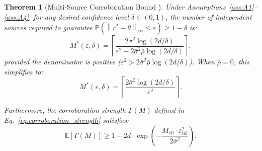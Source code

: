 \documentclass[11pt,a4paper]{article}
\newtheorem{theorem}{Theorem}[section]
\theoremstyle{definition}
\newcommand{\E}{\mathbb{E}}
\newcommand{\Pbb}{\mathbb{P}}
\newcommand{\norm}[1]{\left\lVert#1\right\rVert}
\begin{document}
\begin{theorem}[Multi-Source Corroboration Bound ]
\label{thm:corroboration}
Under Assumptions~\ref{ass:A1}--\ref{ass:A4}, for any desired confidence level $\delta \in (0, 1)$, the number of independent sources required to guarantee $\Pbb(\norm{c^* - \theta}_\infty \leq \varepsilon) \geq 1 - \delta$ is:
\begin{equation}
    M^*(\varepsilon, \delta) = \left\lceil \frac{2\bar{\sigma}^2 \log(2d/\delta)}{\varepsilon^2 - 2\bar{\sigma}^2 \bar{\rho} \log(2d/\delta)} \right\rceil,
    \label{eq:M_star}
\end{equation}
provided the denominator is positive ($\varepsilon^2 > 2\bar{\sigma}^2 \bar{\rho} \log(2d/\delta)$). When $\bar{\rho} = 0$, this simplifies to:
\begin{equation}
    M^*(\varepsilon, \delta) = \left\lceil \frac{2\bar{\sigma}^2 \log(2d/\delta)}{\varepsilon^2} \right\rceil.
    \label{eq:M_star_independent}
\end{equation}

Furthermore, the corroboration strength $\Gamma(M)$ defined in Eq.~\eqref{eq:corroboration_strength} satisfies:
\begin{equation}
    \E[\Gamma(M)] \geq 1 - 2d \cdot \exp\left(-\frac{M_{\mathrm{eff}} \cdot \varepsilon_{\mathrm{tol}}^2}{2\bar{\sigma}^2}\right).
    \label{eq:gamma_bound}
\end{equation}
\end{theorem}
\end{document}
